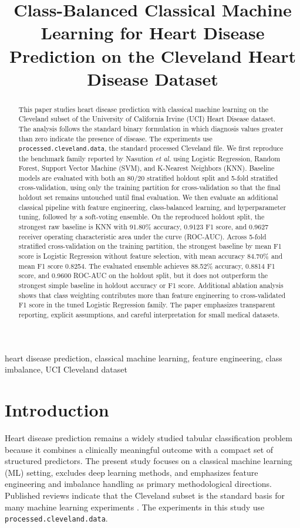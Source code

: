 \documentclass[conference]{IEEEtran}
\title{Class-Balanced Classical Machine Learning for Heart Disease Prediction on the Cleveland Heart Disease Dataset}
\author{
\IEEEauthorblockN{Praveenasarma B.}
\IEEEauthorblockA{
Department of Computer Science \& Engineering\\
University of Moratuwa, Sri Lanka\\
praveenasarma2001@gmail.com
}
}
\begin{document}
\maketitle

\begin{abstract}
This paper studies heart disease prediction with classical machine learning on the Cleveland subset of the University of California Irvine (UCI) Heart Disease dataset. The analysis follows the standard binary formulation in which diagnosis values greater than zero indicate the presence of disease. The experiments use \texttt{processed.cleveland.data}, the standard processed Cleveland file. We first reproduce the benchmark family reported by Nasution \textit{et al.} using Logistic Regression, Random Forest, Support Vector Machine (SVM), and K-Nearest Neighbors (KNN). Baseline models are evaluated with both an 80/20 stratified holdout split and 5-fold stratified cross-validation, using only the training partition for cross-validation so that the final holdout set remains untouched until final evaluation. We then evaluate an additional classical pipeline with feature engineering, class-balanced learning, and hyperparameter tuning, followed by a soft-voting ensemble. On the reproduced holdout split, the strongest raw baseline is KNN with 91.80\% accuracy, 0.9123 F1 score, and 0.9627 receiver operating characteristic area under the curve (ROC-AUC). Across 5-fold stratified cross-validation on the training partition, the strongest baseline by mean F1 score is Logistic Regression without feature selection, with mean accuracy 84.70\% and mean F1 score 0.8254. The evaluated ensemble achieves 88.52\% accuracy, 0.8814 F1 score, and 0.9600 ROC-AUC on the holdout split, but it does not outperform the strongest simple baseline in holdout accuracy or F1 score. Additional ablation analysis shows that class weighting contributes more than feature engineering to cross-validated F1 score in the tuned Logistic Regression family. The paper emphasizes transparent reporting, explicit assumptions, and careful interpretation for small medical datasets.
\end{abstract}

\begin{IEEEkeywords}
heart disease prediction, classical machine learning, feature engineering, class imbalance, UCI Cleveland dataset
\end{IEEEkeywords}

\section{Introduction}
Heart disease prediction remains a widely studied tabular classification problem because it combines a clinically meaningful outcome with a compact set of structured predictors. The present study focuses on a classical machine learning (ML) setting, excludes deep learning methods, and emphasizes feature engineering and imbalance handling as primary methodological directions. Published reviews indicate that the Cleveland subset is the standard basis for many machine learning experiments \cite{detrano1989cad,uciheart,ruqiya2023review,akella2021cad,rabbi2018performance}. The experiments in this study use \texttt{processed.cleveland.data}.
\end{document}
